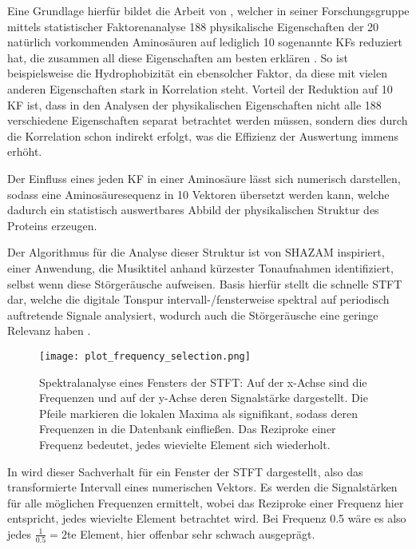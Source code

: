     Eine Grundlage hierfür bildet die Arbeit von \citeauthor{kidera}, welcher in seiner Forschungsgruppe mittels statistischer Faktorenanalyse 188 physikalische Eigenschaften der 20 natürlich vorkommenden Aminosäuren auf lediglich 10 sogenannte \acp{KF} reduziert hat, die zusammen all diese Eigenschaften am besten erklären . So ist beispielsweise die Hydrophobizität ein ebensolcher Faktor, da diese mit vielen anderen Eigenschaften stark in Korrelation steht. Vorteil der Reduktion auf 10 \ac{KF} ist, dass in den Analysen der physikalischen Eigenschaften nicht alle 188 verschiedene Eigenschaften separat betrachtet werden müssen, sondern dies durch die Korrelation schon indirekt erfolgt, was die Effizienz der Auswertung immens erhöht.

    Der Einfluss eines jeden \ac{KF} in einer Aminosäure lässt sich numerisch darstellen, sodass eine Aminosäuresequenz in 10 Vektoren übersetzt werden kann, welche dadurch ein statistisch auswertbares Abbild der physikalischen Struktur des Proteins erzeugen.

    Der Algorithmus für die Analyse dieser Struktur ist von SHAZAM inspiriert, einer Anwendung, die Musiktitel anhand kürzester Tonaufnahmen identifiziert, selbst wenn diese Störgeräusche aufweisen. Basis hierfür stellt die schnelle \ac{STFT} dar, welche die digitale Tonspur intervall-/fensterweise spektral auf periodisch auftretende Signale analysiert, wodurch auch die Störgeräusche eine geringe Relevanz haben .

    \begin{figure}[H]
        \texttt{[image: plot\_frequency\_selection.png]}
        \caption[Spektralanalyse eines Intervalls/Fensters der STFT]{Spektralanalyse eines Fensters der \ac{STFT}\@: Auf der x-Achse sind die Frequenzen und auf der y-Achse deren Signalstärke dargestellt. Die Pfeile markieren die lokalen Maxima als signifikant, sodass deren Frequenzen in die Datenbank einfließen. Das Reziproke einer Frequenz bedeutet, jedes wievielte Element sich wiederholt.}
        \label{fig:freq_selection}
    \end{figure}

    In  wird dieser Sachverhalt für ein Fenster der \ac{STFT} dargestellt, also das transformierte Intervall eines numerischen Vektors. Es werden die Signalstärken für alle möglichen Frequenzen ermittelt, wobei das Reziproke einer Frequenz hier entspricht, jedes wievielte Element betrachtet wird. Bei Frequenz 0.5 wäre es also jedes $\frac{1}{0.5} = 2$te Element, hier offenbar sehr schwach ausgeprägt.

